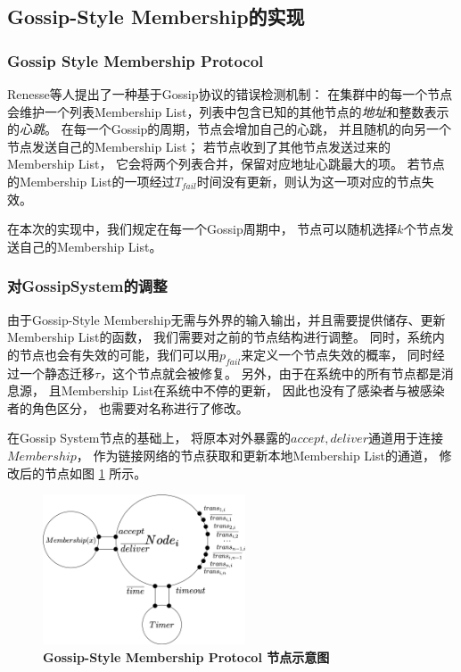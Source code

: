 \subsection{Gossip-Style Membership的实现}

\subsubsection{Gossip Style Membership Protocol}
Renesse等人提出了一种基于Gossip协议的错误检测机制：
在集群中的每一个节点会维护一个列表Membership List，列表中包含已知的其他节点的\textit{地址}和整数表示的\textit{心跳}。
在每一个Gossip的周期，节点会增加自己的心跳，
并且随机的向另一个节点发送自己的Membership List；
若节点收到了其他节点发送过来的Membership List，
它会将两个列表合并，保留对应地址心跳最大的项。
若节点的Membership List的一项经过$T_{fail}$时间没有更新，则认为这一项对应的节点失效。

在本次的实现中，我们规定在每一个Gossip周期中，
节点可以随机选择$k$个节点发送自己的Membership List。

\subsubsection{对GossipSystem的调整}\label{ch:membership_system}
由于Gossip-Style Membership无需与外界的输入输出，并且需要提供储存、更新Membership List的函数，
我们需要对之前的节点结构进行调整。
同时，系统内的节点也会有失效的可能，我们可以用$p_{fail}$来定义一个节点失效的概率，
同时经过一个静态迁移$\tau$，这个节点就会被修复。
另外，由于在系统中的所有节点都是消息源，
且Membership List在系统中不停的更新，
因此也没有了感染者与被感染者的角色区分，
也需要对名称进行了修改。

在Gossip System节点的基础上，
将原本对外暴露的$accept,deliver$通道用于连接$Membership$，
作为链接网络的节点获取和更新本地Membership List的通道，
修改后的节点如图
\ref{fig:membership_node}
所示。

\begin{figure}[!htbp]
	\small
	\centering
	\includegraphics[width=6cm]{../figure/Node.png}
    \caption{\textbf{Gossip-Style Membership Protocol 节点示意图}}
    \label{fig:membership_node}
\end{figure}

